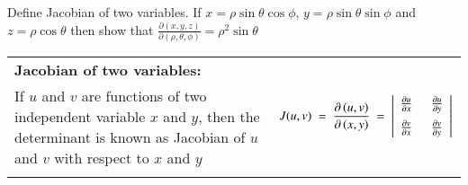 \documentclass[11pt]{extarticle}
\begin{document}

\textbf{} Define Jacobian of two variables. If $x=\rho \sin\theta \cos\phi$, $y=\rho \sin\theta \sin\phi$ and $z=\rho \cos\theta$ then show that $\frac{\partial\left(x,y,z\right)}{\partial\left(\rho,\theta,\phi\right)} = \rho^2\sin\theta$

\begin{tabularx}{\textwidth}{X|p{6.1cm}}
   \textbf{Jacobian of two variables:}&
   \multirow{3}{*}{
      $\begin{aligned}
         J(u,v) \ = \ 
         \frac{\partial\left(u,v\right)}{\partial\left(x,y\right)}
         \ = \ \left|\begin{array}{ll}
            \frac{\partial u}{\partial x} & \hspace{0.5em}
            \frac{\partial u}{\partial y}\\[1.5ex]
            \frac{\partial v}{\partial x} & \hspace{0.5em}
            \frac{\partial v}{\partial y}
            \end{array}\right|
      \end{aligned}$}\\
   If $u$ and $v$ are functions of two independent variable $x$ and $y$, then the determinant is known as Jacobian of $u$ and $v$ with respect to $x$ and $y$\\[-4ex]\\
\end{tabularx}
\end{document}
